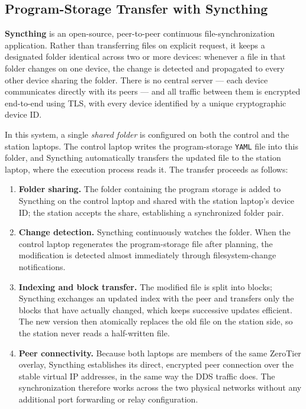 \subsection{Program-Storage Transfer with Syncthing}

\textbf{Syncthing} is an open-source, peer-to-peer continuous file-synchronization application. Rather than transferring files on explicit request, it keeps a designated folder identical across two or more devices: whenever a file in that folder changes on one device, the change is detected and propagated to every other device sharing the folder. There is no central server --- each device communicates directly with its peers --- and all traffic between them is encrypted end-to-end using TLS, with every device identified by a unique cryptographic device ID.

In this system, a single \textit{shared folder} is configured on both the control and the station laptops. The control laptop writes the program-storage \texttt{YAML} file into this folder, and Syncthing automatically transfers the updated file to the station laptop, where the execution process reads it. The transfer proceeds as follows:

\begin{enumerate}
    \item \textbf{Folder sharing.} The folder containing the program storage is added to Syncthing on the control laptop and shared with the station laptop's device ID; the station accepts the share, establishing a synchronized folder pair.
    \item \textbf{Change detection.} Syncthing continuously watches the folder. When the control laptop regenerates the program-storage file after planning, the modification is detected almost immediately through filesystem-change notifications.
    \item \textbf{Indexing and block transfer.} The modified file is split into blocks; Syncthing exchanges an updated index with the peer and transfers only the blocks that have actually changed, which keeps successive updates efficient. The new version then atomically replaces the old file on the station side, so the station never reads a half-written file.
    \item \textbf{Peer connectivity.} Because both laptops are members of the same ZeroTier overlay, Syncthing establishes its direct, encrypted peer connection over the stable virtual IP addresses, in the same way the DDS traffic does. The synchronization therefore works across the two physical networks without any additional port forwarding or relay configuration.
\end{enumerate}

